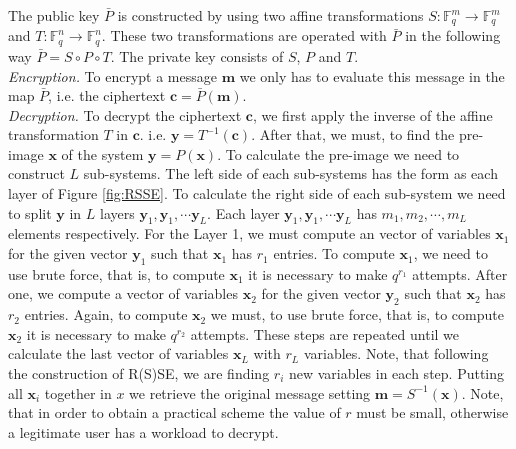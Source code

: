 The public key $\bar{P}$ is constructed by using two affine transformations  $S\colon\mathbb{F}_q^{m}\rightarrow \mathbb{F}_q^{m}$ and $T\colon\mathbb{F}_q^{n}\rightarrow \mathbb{F}_q^{n}$. These two transformations are operated with $\bar{P}$ in the following way $\bar{P} = S \circ P \circ T$. The private key consists of $S$, $P$ and $T$.\\
\noindent
\textit{Encryption.} To encrypt a message $\boldsymbol m$ we only has to evaluate this message in the map $\bar{P}$, i.e. the ciphertext $\boldsymbol c = \bar{P}(\boldsymbol m)$.\\
\noindent
\textit{Decryption.} To decrypt the ciphertext $\boldsymbol c$, we first apply the inverse of the affine transformation $T$ in $\boldsymbol c$. i.e. $\boldsymbol y = T^{-1}(\boldsymbol c)$. After that, we must, to find the pre-image $\boldsymbol x$ of the system $\boldsymbol y = P(\boldsymbol x)$. To calculate the pre-image we need to construct $L$ sub-systems. The left side of each sub-systems has the form as each layer of Figure \ref{fig:RSSE}. To calculate the right side of each sub-system we need to split $\boldsymbol y$ in $L$ layers $\boldsymbol y_1, \boldsymbol y_1, \cdots \boldsymbol y_L$. Each layer $\boldsymbol y_1, \boldsymbol y_1, \cdots \boldsymbol y_L$ has $m_1, m_2, \cdots, m_L$ elements respectively. For the Layer 1, we must compute an vector of variables $\boldsymbol x_1$ for the given vector $\boldsymbol y_1$ such that $\boldsymbol x_1$ has $r_1$ entries. To compute $\boldsymbol x_1$, we need to use brute force, that is, to  compute $\boldsymbol x_1$ it is necessary to make $q^{r_1}$ attempts. After one, we compute a vector of variables $\boldsymbol x_2$ for the given vector $\boldsymbol y_2$ such that $\boldsymbol x_2$ has $r_2$ entries. Again, to compute $\boldsymbol x_2$ we must, to use brute force, that is, to compute $\boldsymbol x_2$ it is necessary to make $q^{r_2}$ attempts. These steps are repeated until we calculate the last vector of variables $\boldsymbol x_L$ with $r_L$ variables. Note, that following the construction of R(S)SE, we are finding $r_i$ new variables in each step. Putting all $\boldsymbol x_i$ together in $x$ we retrieve the original message setting $\boldsymbol m = S^{-1}(\boldsymbol x)$. Note, that in order to obtain a practical scheme the value of $r$ must be small, otherwise a legitimate user has a workload to decrypt.

